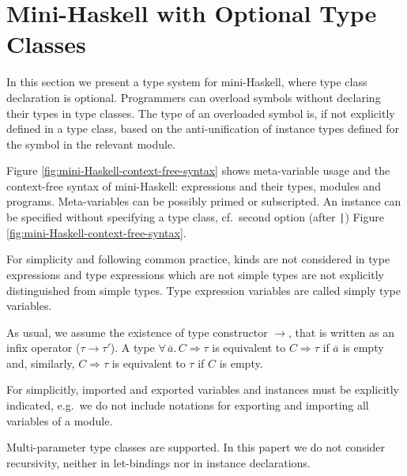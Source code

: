 \section{Mini-Haskell with Optional Type Classes}
\label{Optional-type-classes}

In this section we present a type system for mini-Haskell, where type
class declaration is optional. Programmers can overload symbols
without declaring their types in type classes. The type of an
overloaded symbol is, if not explicitly defined in a type class, based
on the anti-unification of instance types defined for the symbol in
the relevant module.

Figure \ref{fig:mini-Haskell-context-free-syntax} shows meta-variable
usage and the context-free syntax of mini-Haskell: expressions and
their types, modules and programs. Meta-variables can be possibly
primed or subscripted. An instance can be specified without specifying
a type class, cf.~second option (after {\tt |}) Figure
\ref{fig:mini-Haskell-context-free-syntax}.


For simplicity and following common practice, kinds are not considered
in type expressions and type expressions which are not simple types
are not explicitly distinguished from simple types. Type expression
variables are called simply type variables. 

As usual, we assume the existence of type constructor $\to$, that is
written as an infix operator ($\tau \to \tau'$). A type
$\forall\,\overline{a}.\,C\Rightarrow \tau$ is equivalent to
$C\Rightarrow \tau$ if $\overline{a}$ is empty and, similarly,
$C\Rightarrow \tau$ is equivalent to $\tau$ if $C$ is empty.

For simplicitly, imported and exported variables and instances must be
explicitly indicated, e.g.~we do not include notations for exporting
and importing all variables of a module.

Multi-parameter type classes are supported. In this papert we do not
consider recursivity, neither in let-bindings nor in instance
declarations. 

